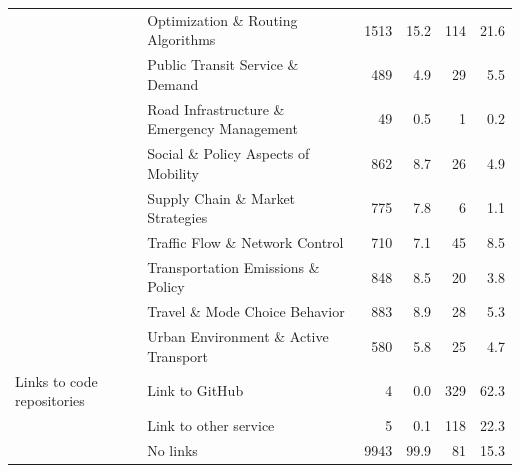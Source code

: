 \documentclass[
  authoryear,
  review,
  3p]{elsarticle}
\begin{document}
\begin{table}
{{\begin{tabular}[t]{llrrrr}
 & Optimization \& Routing Algorithms & \num{1513} & \num{15.2} & \num{114} & \num{21.6}\\
 & Public Transit Service \& Demand & \num{489} & \num{4.9} & \num{29} & \num{5.5}\\
 & Road Infrastructure \& Emergency Management & \num{49} & \num{0.5} & \num{1} & \num{0.2}\\
 & Social \& Policy Aspects of Mobility & \num{862} & \num{8.7} & \num{26} & \num{4.9}\\
 & Supply Chain \& Market Strategies & \num{775} & \num{7.8} & \num{6} & \num{1.1}\\
 & Traffic Flow \& Network Control & \num{710} & \num{7.1} & \num{45} & \num{8.5}\\
 & Transportation Emissions \& Policy & \num{848} & \num{8.5} & \num{20} & \num{3.8}\\
 & Travel \& Mode Choice Behavior & \num{883} & \num{8.9} & \num{28} & \num{5.3}\\
 & Urban Environment \& Active Transport & \num{580} & \num{5.8} & \num{25} & \num{4.7}\\
\midrule
Links to code repositories & Link to GitHub & \num{4} & \num{0.0} & \num{329} & \num{62.3}\\
 & Link to other service & \num{5} & \num{0.1} & \num{118} & \num{22.3}\\
 & No links & \num{9943} & \num{99.9} & \num{81} & \num{15.3}\\
\bottomrule
\end{tabular}}

}

\end{table}%
\end{document}
